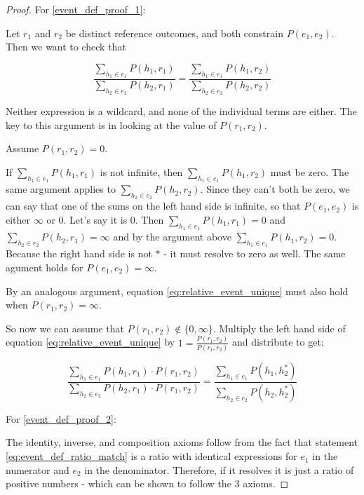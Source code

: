 \documentclass[twoside]{article}
\theoremstyle{plain}%
\theoremstyle{definition}
\theoremstyle{remark}
\begin{document}
\begin{proof}
For \ref{event_def_proof_1}:

Let \(r_1\) and \(r_2\) be distinct reference outcomes, and both constrain \(P(e_1, e_2)\). Then we want to check that

\begin{equation}
\label{eq:relative_event_unique}
\frac{\sum_{h_1 \in e_1} P(h_1, r_1)}{\sum_{h_2 \in e_2} P(h_2, r_1)} = \frac{\sum_{h_1 \in e_1} P(h_1, r_2)}{\sum_{h_2 \in e_2} P(h_2, r_2)}
\end{equation}

Neither expression is a wildcard, and none of the individual terms are either. The key to this argument is in looking at the value of \(P(r_1, r_2)\).

Assume \(P(r_1, r_2) = 0\). 

If \(\sum_{h_1 \in e_1} P(h_1, r_1)\) is not infinite, then \(\sum_{h_1 \in e_1} P(h_1, r_2)\) must be zero. The same argument applies to \(\sum_{h_2 \in e_2} P(h_2, r_2)\). Since they can't both be zero, we can say that one of the sums on the left hand side is infinite, so that \(P(e_1, e_2)\) is either \(\infty\) or 0. Let's say it is 0. Then \(\sum_{h_1 \in e_1} P(h_1, r_1) = 0\) and \(\sum_{h_2 \in e_2} P(h_2, r_1) = \infty\) and by the argument above \(\sum_{h_1 \in e_1} P(h_1, r_2) = 0\). Because the right hand side is not \(\ast\) - it must resolve to zero as well. The same agument holds for \(P(e_1, e_2) = \infty\).

By an analogous argument, equation \ref{eq:relative_event_unique} must also hold when \(P(r_1, r_2) = \infty\).

So now we can assume that \(P(r_1, r_2) \notin \{0, \infty\} \). Multiply the left hand side of equation \ref{eq:relative_event_unique} by \(1 = \frac{P(r_1, r_2)}{P(r_1, r_2)}\) and distribute to get:

\[\frac{\sum_{h_1 \in e_1} P(h_1, r_1) \cdot P(r_1, r_2)}{\sum_{h_2 \in e_2} P(h_2, r_1) \cdot P(r_1, r_2)} = \frac{\sum_{h_1 \in e_1} P(h_1, h_2^*)}{\sum_{h_2 \in e_2} P(h_2, h_2^*)}\]

For \ref{event_def_proof_2}:

The identity, inverse, and composition axioms follow from the fact that statement \ref{eq:event_def_ratio_match} is a ratio with identical expressions for \(e_1\) in the numerator and \(e_2\) in the denominator. Therefore, if it resolves it is just a ratio of positive numbers - which can be shown to follow the 3 axioms.
\end{proof}
\end{document}
